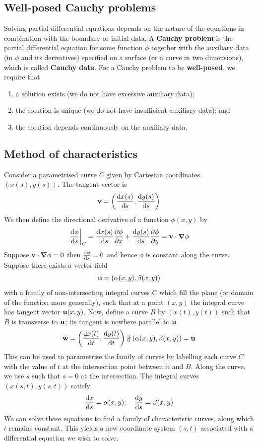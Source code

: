 \documentclass[a4paper]{article}
\begin{document}
\subsection{Well-posed Cauchy problems}
Solving partial differential equations depends on the nature of the equations in combination with the boundary or initial data.
A \textbf{Cauchy problem} is the partial differential equation for some function \( \phi \) together with the auxiliary data (in \( \phi \) and its derivatives) specified on a surface (or a curve in two dimensions), which is called \textbf{Cauchy data}.
For a Cauchy problem to be \textbf{well-posed}, we require that
\begin{enumerate}
	\item a solution exists (we do not have excessive auxiliary data);
	\item the solution is unique (we do not have insufficient auxiliary data); and
	\item the solution depends continuously on the auxiliary data.
\end{enumerate}

\subsection{Method of characteristics}
Consider a parametrised curve \( C \) given by Cartesian coordinates \( (x(s), y(s)) \).
The tangent vector is
\[
	{\bf v} = \qty(\dv{x(s)}{s}, \dv{y(s)}{s})
\]
We then define the directional derivative of a function \( \phi(x,y) \) by
\[
	\eval{\dv{\phi}{s}}_C = \dv{x(s)}{s} \pdv{\phi}{x} + \dv{y(s)}{s}\pdv{\phi}{y} = \bfv \cdot \grad{\phi}
\]
Suppose \( {\bf v} \cdot \grad{\phi} = 0 \) then \( \dv{\phi}{s} = 0 \) and hence \( \phi \) is constant along the curve.
Suppose there exists a vector field
\[
	{\bf u} = \qty(\alpha(x,y), \beta(x,y))
\]
with a family of non-intersecting integral curves \( C \) which fill the plane (or domain of the function more generally), such that at a point \( (x,y) \) the integral curve has tangent vector \( {\bf u}(x,y) \).
Now, define a curve \( B \) by \( (x(t), y(t)) \) such that \( B \) is transverse to \( {\bf u} \); its tangent is nowhere parallel to \( {\bf u} \).
\[
	{\bf w} = \qty(\dv{x(t)}{t}, \dv{y(t)}{t}) \nparallel \qty(\alpha(x,y), \beta(x,y)) = {\bf u}
\]
This can be used to parametrise the family of curves by labelling each curve \( C \) with the value of \( t \) at the intersection point between it and \( B \).
Along the curve, we use \( s \) such that \( s = 0 \) at the intersection.
The integral curves \( (x(s,t), y(s,t)) \) satisfy
\[
	\dv{x}{s} = \alpha(x,y);\quad \dv{y}{s} = \beta(x,y)
\]
We can solve these equations to find a family of characteristic curves, along which \( t \) remains constant.
This yields a new coordinate system \( (s,t) \) associated with a differential equation we wish to solve.
\end{document}
